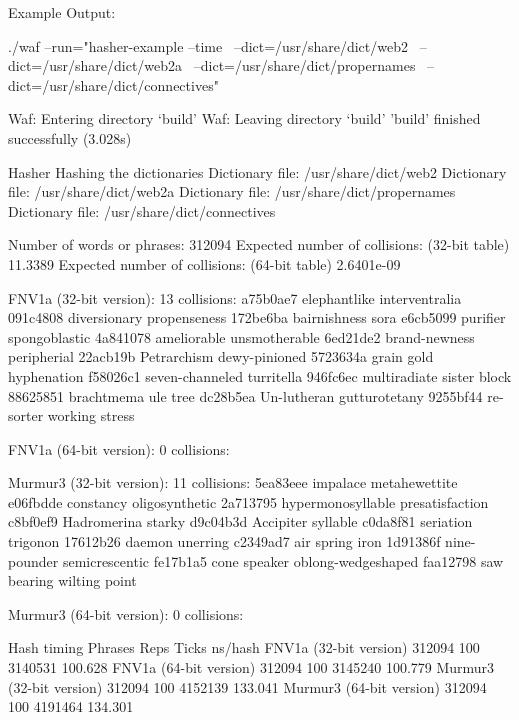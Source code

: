 Example Output\+: \begin{DoxyVerb}./waf --run="hasher-example --time \
  --dict=/usr/share/dict/web2 \
  --dict=/usr/share/dict/web2a \
  --dict=/usr/share/dict/propernames \
  --dict=/usr/share/dict/connectives"

Waf: Entering directory `build'
Waf: Leaving directory `build'
'build' finished successfully (3.028s)

Hasher
Hashing the dictionaries
Dictionary file: /usr/share/dict/web2
Dictionary file: /usr/share/dict/web2a
Dictionary file: /usr/share/dict/propernames
Dictionary file: /usr/share/dict/connectives

Number of words or phrases: 312094
Expected number of collisions: (32-bit table) 11.3389
Expected number of collisions: (64-bit table) 2.6401e-09

FNV1a (32-bit version): 13 collisions:
a75b0ae7  elephantlike        interventralia
091c4808  diversionary        propenseness
172be6ba  bairnishness        sora
e6cb5099  purifier            spongoblastic
4a841078  ameliorable         unsmotherable
6ed21de2  brand-newness       peripherial
22acb19b  Petrarchism         dewy-pinioned
5723634a  grain gold          hyphenation
f58026c1  seven-channeled     turritella
946fc6ec  multiradiate        sister block
88625851  brachtmema          ule tree
dc28b5ea  Un-lutheran         gutturotetany
9255bf44  re-sorter           working stress

FNV1a (64-bit version): 0 collisions:

Murmur3 (32-bit version): 11 collisions:
5ea83eee  impalace            metahewettite
e06fbdde  constancy           oligosynthetic
2a713795  hypermonosyllable   presatisfaction
c8bf0ef9  Hadromerina         starky
d9c04b3d  Accipiter           syllable
c0da8f81  seriation           trigonon
17612b26  daemon              unerring
c2349ad7  air spring          iron
1d91386f  nine-pounder        semicrescentic
fe17b1a5  cone speaker        oblong-wedgeshaped
faa12798  saw bearing         wilting point

Murmur3 (64-bit version): 0 collisions:

Hash timing                        Phrases      Reps     Ticks     ns/hash
FNV1a (32-bit version)              312094       100   3140531     100.628
FNV1a (64-bit version)              312094       100   3145240     100.779
Murmur3 (32-bit version)            312094       100   4152139     133.041
Murmur3 (64-bit version)            312094       100   4191464     134.301\end{DoxyVerb}
 

